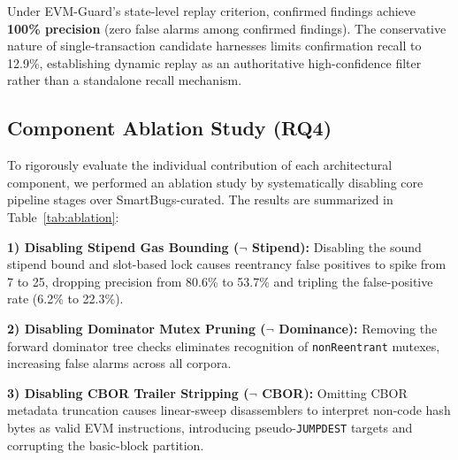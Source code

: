 \documentclass[conference]{IEEEtran}
\begin{document}
Under EVM-Guard's state-level replay criterion, confirmed findings achieve \textbf{100\% precision} (zero false alarms among confirmed findings). The conservative nature of single-transaction candidate harnesses limits confirmation recall to 12.9\%, establishing dynamic replay as an authoritative high-confidence filter rather than a standalone recall mechanism.

\subsection{Component Ablation Study (RQ4)}
To rigorously evaluate the individual contribution of each architectural component, we performed an ablation study by systematically disabling core pipeline stages over SmartBugs-curated. The results are summarized in Table~\ref{tab:ablation}:

\smallskip
\noindent\textbf{1) Disabling Stipend Gas Bounding ($\neg$ Stipend):} Disabling the sound stipend bound and slot-based lock causes reentrancy false positives to spike from 7 to 25, dropping precision from 80.6\% to 53.7\% and tripling the false-positive rate (6.2\% to 22.3\%).

\smallskip
\noindent\textbf{2) Disabling Dominator Mutex Pruning ($\neg$ Dominance):} Removing the forward dominator tree checks eliminates recognition of \texttt{nonReentrant} mutexes, increasing false alarms across all corpora.

\smallskip
\noindent\textbf{3) Disabling CBOR Trailer Stripping ($\neg$ CBOR):} Omitting CBOR metadata truncation causes linear-sweep disassemblers to interpret non-code hash bytes as valid EVM instructions, introducing pseudo-\texttt{JUMPDEST} targets and corrupting the basic-block partition.

\begin{table}[h]
\centering
\small
\renewcommand{\arraystretch}{1.12}
\caption{Component Ablation Analysis over SmartBugs Reentrancy}
\label{tab:ablation}
\end{table}
\end{document}
